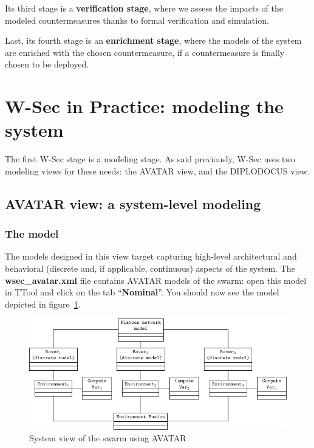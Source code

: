 \documentclass{article}
\begin{document}
Its third stage is a \textbf{verification stage}, where we assess the impacts of the modeled countermeasures thanks to formal verification and simulation.

Last, its fourth stage is an \textbf{enrichment stage}, where the models of the system are enriched with the chosen countermeasure, if a countermeasure is finally chosen to be deployed.


\section{W-Sec in Practice: modeling the system}

The first W-Sec stage is a modeling stage. As said previously, W-Sec uses two modeling views for these needs: the AVATAR view, and the DIPLODOCUS view.

\subsection{AVATAR view: a system-level modeling}

\subsubsection{The model}

The models designed in this view target capturing high-level architectural and behavioral (discrete and, if applicable, continuous) aspects of the system. The \textbf{wsec\_avatar.xml} file contains AVATAR models of the swarm: open this model in TTool and click on the tab ``\textbf{Nominal}''. You should now see the model depicted in figure~\ref{fig:avatarmodel}.

\begin{figure}
	\centering
	\includegraphics{figures/avatarmodel.pdf}
	\caption{System view of the swarm using AVATAR}
	\label{fig:avatarmodel}
\end{figure}
\end{document}
